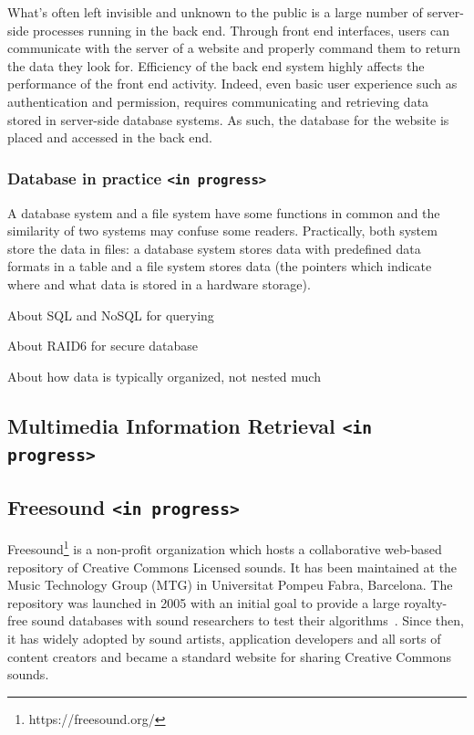 What's often left invisible and unknown to the public is a large number of server-side processes running in the back end. Through front end interfaces, users can communicate with the server of a website and properly command them to return the data they look for. Efficiency of the back end system highly affects the performance of the front end activity. Indeed, even basic user experience such as authentication and permission, requires communicating and retrieving data stored in server-side database systems. As such, the database for the website is placed and accessed in the back end.

\subsubsection{Database in practice \texttt{<in progress>}}
A database system and a file system have some functions in common and the similarity of two systems may confuse some readers. Practically, both system store the data in files: a database system stores data with predefined data formats in a table and a file system stores data (the pointers which indicate where and what data is stored in a hardware storage).

About SQL and NoSQL for querying

About RAID6 for secure database

About how data is typically organized, not nested much



\subsection{Multimedia Information Retrieval \texttt{<in progress>}}

\subsection{Freesound \texttt{<in progress>}}
Freesound\footnote{https://freesound.org/} is a non-profit organization which hosts a collaborative web-based repository of Creative Commons Licensed sounds. It has been maintained at the Music Technology Group (MTG) in Universitat Pompeu Fabra, Barcelona. The repository was launched in 2005 with an initial goal to provide a large royalty-free sound databases with sound researchers to test their algorithms~\cite{frederic2013}. Since then, it has widely adopted by sound artists, application developers and all sorts of content creators and became a standard website for sharing Creative Commons sounds.

